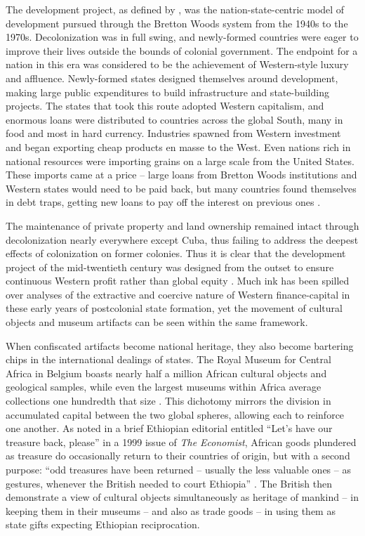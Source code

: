 \documentclass[american]{../../../coursework}
\begin{document}
The development project, as defined by \textcite{McM04}, was the
nation-state-centric model of development pursued through the Bretton Woods
system from the 1940s to the 1970s. Decolonization was in full swing, and
newly-formed countries were eager to improve their lives outside the bounds of
colonial government. The endpoint for a nation in this era was considered to
be the achievement of Western-style luxury and affluence. Newly-formed states
designed themselves around development, making large public expenditures to
build infrastructure and state-building projects. The states that took this
route adopted Western capitalism, and enormous loans were distributed to
countries across the global South, many in food and most in hard currency.
Industries spawned from Western investment and began exporting cheap products
en masse to the West. Even nations rich in national resources were importing
grains on a large scale from the United States. These imports came at a price
-- large loans from Bretton Woods institutions and Western states would need
to be paid back, but many countries found themselves in debt traps, getting
new loans to pay off the interest on previous ones \parencite{McM04}.

The maintenance of private property and land ownership remained intact through
decolonization nearly everywhere except Cuba, thus failing to address the
deepest effects of colonization on former colonies. Thus it is clear that the
development project of the mid-twentieth century was designed from the outset
to ensure continuous Western profit rather than global equity
\parencite{Fra66}. Much ink has been spilled over analyses of the extractive
and coercive nature of Western finance-capital in these early years of
postcolonial state formation, yet the movement of cultural objects and museum
artifacts can be seen within the same framework.

When confiscated artifacts become national heritage, they also become
bartering chips in the international dealings of states. The Royal Museum for
Central Africa in Belgium boasts nearly half a million African cultural
objects and geological samples, while even the largest museums within Africa
average collections one hundredth that size \parencite{Shy09}. This dichotomy
mirrors the division in accumulated capital between the two global spheres,
allowing each to reinforce one another. As noted in a brief Ethiopian
editorial entitled ``Let's have our treasure back, please'' in a 1999 issue of
\textit{The Economist}, African goods plundered as treasure do occasionally
return to their countries of origin, but with a second purpose: ``odd
treasures have been returned -- usually the less valuable ones -- as gestures,
whenever the British needed to court Ethiopia'' \parencite[66]{The99}. The
British then demonstrate a view of cultural objects simultaneously as heritage
of mankind -- in keeping them in their museums -- and also as trade goods --
in using them as state gifts expecting Ethiopian reciprocation.
\end{document}
